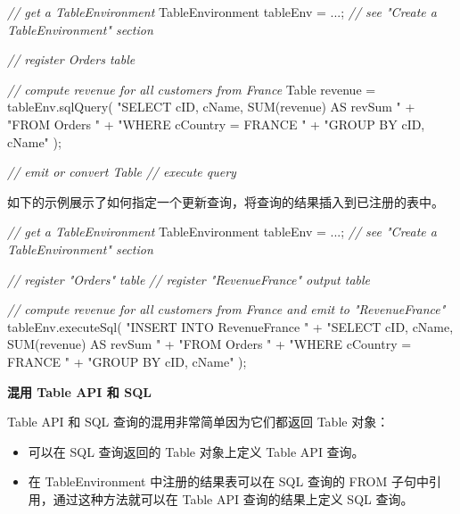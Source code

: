 \documentclass[cn,11pt,chinese]{elegantbook}
\newenvironment{Shaded}{}{}
\newcommand{\CommentTok}[1]{\textcolor[rgb]{0.38,0.63,0.69}{\textit{#1}}}
\newcommand{\FunctionTok}[1]{\textcolor[rgb]{0.02,0.16,0.49}{#1}}
\newcommand{\NormalTok}[1]{#1}
\newcommand{\StringTok}[1]{\textcolor[rgb]{0.25,0.44,0.63}{#1}}
\providecommand{\tightlist}{%
  \setlength{\itemsep}{0pt}\setlength{\parskip}{0pt}}
\begin{document}
\begin{Shaded}
\begin{Highlighting}[]
\CommentTok{// get a TableEnvironment}
\NormalTok{TableEnvironment tableEnv = ...; }\CommentTok{// see "Create a TableEnvironment" section}

\CommentTok{// register Orders table}

\CommentTok{// compute revenue for all customers from France}
\NormalTok{Table revenue = tableEnv.}\FunctionTok{sqlQuery}\NormalTok{(}
    \StringTok{"SELECT cID, cName, SUM(revenue) AS revSum "}\NormalTok{ +}
    \StringTok{"FROM Orders "}\NormalTok{ +}
    \StringTok{"WHERE cCountry = \textquotesingle{}FRANCE\textquotesingle{} "}\NormalTok{ +}
    \StringTok{"GROUP BY cID, cName"}
\NormalTok{);}

\CommentTok{// emit or convert Table}
\CommentTok{// execute query}
\end{Highlighting}
\end{Shaded}

如下的示例展示了如何指定一个更新查询，将查询的结果插入到已注册的表中。

\begin{Shaded}
\begin{Highlighting}[]
\CommentTok{// get a TableEnvironment}
\NormalTok{TableEnvironment tableEnv = ...; }\CommentTok{// see "Create a TableEnvironment" section}

\CommentTok{// register "Orders" table}
\CommentTok{// register "RevenueFrance" output table}

\CommentTok{// compute revenue for all customers from France and emit to "RevenueFrance"}
\NormalTok{tableEnv.}\FunctionTok{executeSql}\NormalTok{(}
    \StringTok{"INSERT INTO RevenueFrance "}\NormalTok{ +}
    \StringTok{"SELECT cID, cName, SUM(revenue) AS revSum "}\NormalTok{ +}
    \StringTok{"FROM Orders "}\NormalTok{ +}
    \StringTok{"WHERE cCountry = \textquotesingle{}FRANCE\textquotesingle{} "}\NormalTok{ +}
    \StringTok{"GROUP BY cID, cName"}
\NormalTok{);}
\end{Highlighting}
\end{Shaded}

\textbf{混用 Table API 和 SQL}

Table API 和 SQL 查询的混用非常简单因为它们都返回 Table 对象：

\begin{itemize}
\tightlist
\item
  可以在 SQL 查询返回的 Table 对象上定义 Table API 查询。
\item
  在 TableEnvironment 中注册的结果表可以在 SQL 查询的 FROM
  子句中引用，通过这种方法就可以在 Table API 查询的结果上定义 SQL 查询。
\end{itemize}
\end{document}
